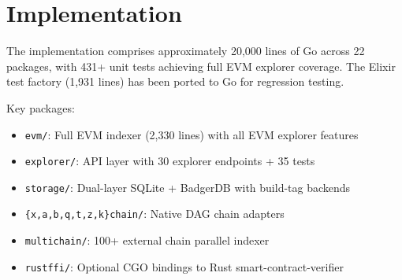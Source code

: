 \section{Implementation}


The implementation comprises approximately 20,000 lines of Go across 22 packages, with
431+ unit tests achieving full EVM explorer coverage. The Elixir test factory
(1,931 lines) has been ported to Go for regression testing.

Key packages:
\begin{itemize}
  \item \texttt{evm/}: Full EVM indexer (2,330 lines) with all EVM explorer features
  \item \texttt{explorer/}: API layer with 30 explorer endpoints + 35 tests
  \item \texttt{storage/}: Dual-layer SQLite + BadgerDB with build-tag backends
  \item \texttt{\{x,a,b,q,t,z,k\}chain/}: Native DAG chain adapters
  \item \texttt{multichain/}: 100+ external chain parallel indexer
  \item \texttt{rustffi/}: Optional CGO bindings to Rust smart-contract-verifier
\end{itemize}

